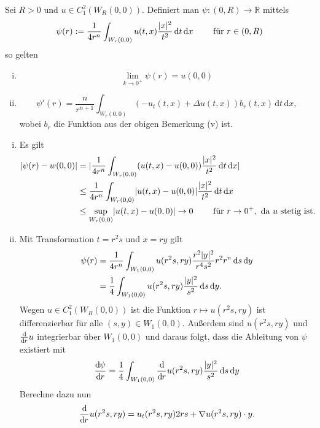 \begin{lemma}
	Sei $R >0$ und $u \in C^2_1(W_R(0,0))$. Definiert man $\psi : (0,R) \to \mathbb{R}$ mittels
	\[
		\psi(r) := \frac{1}{4 r^n} \int_{W_r(0,0)}^{} u(t,x) \frac{\lvert x\rvert^2}{t^2} \,\mathrm{d}t \,\mathrm{d}x \qquad \text{ für } r \in (0,R)
	\]
	so gelten
	\begin{enumerate}[(i)]
		\item \[
			\lim_{k \to 0^+} \psi(r) = u(0,0)
		\]
		\item \[
			\psi'(r) = \frac{n}{r^{n+1}} \int_{W_r(0,0)}^{} (-u_t(t,x)+ \Delta u(t,x))b_r(t,x) \,\mathrm{d}t \,\mathrm{d}x,
		\] wobei $b_r$ die Funktion aus der obigen Bemerkung (v) ist.
	\end{enumerate}
\end{lemma}
\begin{beweis}
	\begin{enumerate}[(i)]
		\item Es gilt
		\begin{align*}
			\lvert \psi(r) - w(0,0)\rvert &= \lvert \frac{1}{4r^n} \int_{W_r(0,0)}^{} (u(t,x)- u(0,0)) \frac{\lvert x\rvert^2}{t^2} \,\mathrm{d}t \, \mathrm{d}x\rvert \\
			& \leq \frac{1}{4 r^n} \int_{W_r(0,0)}^{} \lvert u(t,x)-u(0,0)\rvert \frac{\lvert x\rvert^2}{t^2} \,\mathrm{d}t \, \mathrm{d}x \\
			& \leq \sup_{W_r(0,0)} \lvert u(t,x)-u(0,0)\rvert \to 0 \qquad \text{ für } r \to 0^+, \text{ da } u \text{ stetig ist.}
		\end{align*}
		\item Mit Transformation $t= r^2 s$ und $x = ry$ gilt
		\begin{align*}
			\psi(r) &= \frac{1}{4 r^n} \int_{W_1(0,0)}^{}u(r^2s,ry) \frac{r^2 \lvert y\rvert^2}{r^4 s^2} r^2 r^n \,\mathrm{d}s \,\mathrm{d}y \\
			&= \frac{1}{4} \int_{W_1(0,0)}^{} u(r^2s,ry) \frac{\lvert y\rvert^2}{s^2} \,\mathrm{d}s \,\mathrm{d}y.
		\end{align*}
		Wegen $u \in C^2_1(W_R(0,0))$ ist die Funktion $r \mapsto  u(r^2s,ry)$ ist differenzierbar für alle $(s,y) \in W_1(0,0)$. Außerdem sind
		$u(r^2s,ry)$ und $\frac{\mathrm{d}\mkern-1.0mu }{\mathrm{d}\mkern-1.0mu r} u$ integrierbar über $W_1(0,0)$ und daraus folgt, dass die Ableitung von $\psi$ existiert mit
		\[
			\frac{\mathrm{d}\mkern-1.0mu \psi}{\mathrm{d}\mkern-1.0mu r}  = \frac{1}{4} \int_{W_1(0,0)}^{} \frac{\mathrm{d}\mkern-1.0mu }{\mathrm{d}\mkern-1.0mu r}  u(r^2s,ry) \frac{\lvert y\rvert^2}{s^2} \,\mathrm{d}s \,\mathrm{d}y
		\]
		Berechne dazu nun
		\begin{align*}
			\frac{\mathrm{d}\mkern-1.0mu }{\mathrm{d}\mkern-1.0mu r} u(r^2s,ry) = u_t(r^2s,ry)2rs+  \nabla u(r^2s,ry)\cdot y.
		\end{align*}

\end{enumerate}
\end{beweis}
